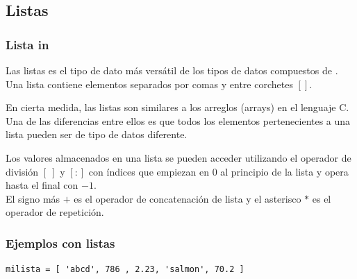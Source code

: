 {\subsection{Listas}
\begin{frame}
\frametitle{Lista in \python}
Las listas es el tipo de dato más versátil de los tipos de datos compuestos de \python.
\\
\bigskip
Una lista contiene elementos separados por comas y entre corchetes $[ ]$.
\end{frame}
\begin{frame}
En cierta medida, las listas son similares a los arreglos (arrays) en el lenguaje C.
\\
\bigskip
Una de las diferencias entre ellos es que todos los elementos pertenecientes a una lista pueden ser de tipo de datos diferente.
\end{frame}
\begin{frame}
Los valores almacenados en una lista se pueden acceder utilizando el operador de división $[ \: ]$ y $[:]$ con índices que empiezan en $0$ al principio de la lista y opera hasta el final con $-1$.
\\
\bigskip
El signo más $+$ es el operador de concatenación de lista y el asterisco $*$ es el operador de repetición.
\end{frame}
\begin{frame}[fragile]
\frametitle{Ejemplos con listas}
\fontsize{12}{12}\selectfont
\begin{verbatim}
milista = [ 'abcd', 786 , 2.23, 'salmon', 70.2 ]


\end{verbatim}
\end{frame}}
